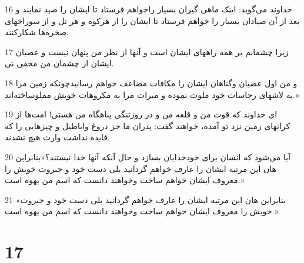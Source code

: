 \par 16 خداوند می‌گوید: اینک ماهی گیران بسیار راخواهم فرستاد تا ایشان را صید نمایند و بعد از آن صیادان بسیار را خواهم فرستاد تا ایشان را از هرکوه و هر تل و از سوراخهای صخره‌ها شکارکنند.
\par 17 زیرا چشمانم بر همه راههای ایشان است و آنها از نظر من پنهان نیست و عصیان ایشان از چشمان من مخفی نی.
\par 18 و من اول عصیان وگناهان ایشان را مکافات مضاعف خواهم رسانیدچونکه زمین مرا به لاشهای رجاسات خود ملوث نموده و میراث مرا به مکروهات خویش مملوساخته‌اند.»
\par 19 ‌ای خداوند که قوت من و قلعه من و در روزتنگی پناهگاه من هستی! امت‌ها از کرانهای زمین نزد تو آمده، خواهند گفت: پدران ما جز دروغ واباطیل و چیزهایی را که فایده نداشت وارث هیچ نشدند.
\par 20 آیا می‌شود که انسان برای خودخدایان بسازد و حال آنکه آنها خدا نیستند؟«بنابراین هان این مرتبه ایشان را عارف خواهم گردانید بلی دست خود و جبروت خویش را معروف ایشان خواهم ساخت وخواهند دانست که اسم من یهوه است.»
\par 21 «بنابراین هان این مرتبه ایشان را عارف خواهم گردانید بلی دست خود و جبروت خویش را معروف ایشان خواهم ساخت وخواهند دانست که اسم من یهوه است.»
 
\chapter{17}

